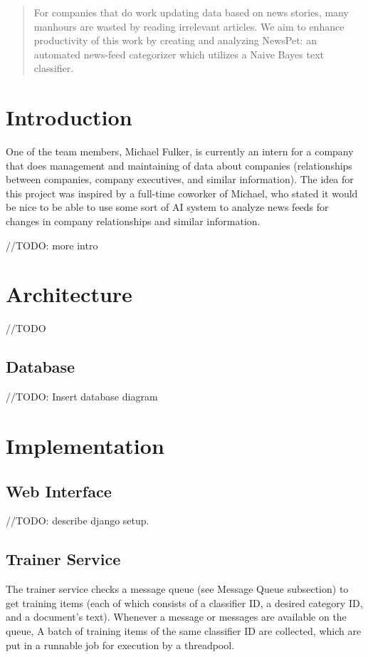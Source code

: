 \documentclass[letterpaper]{article}
\author{Michael Fulker, Anthony Hauber \and Tyson Williams \\
COM S 472 : Principles of Artificial Intelligence\\Department of Computer Science\\ Iowa State University, Ames, IA 50011\\
\texttt{\{calculo, thauber, tyson\}@cs.iastate.edu}}
\begin{document}
\nocopyright%
\maketitle

\begin{abstract}
For companies that do work updating data based on news stories, many manhours are wasted by reading irrelevant articles. We aim to enhance productivity of this work by creating and analyzing NewsPet: an automated news-feed categorizer which utilizes a Naive Bayes text classifier.
\end{abstract}


\section{Introduction}
One of the team members, Michael Fulker, is currently an intern for a company that does management and maintaining of data about companies (relationships between companies, company executives, and similar information). The idea for this project was inspired by a full-time coworker of Michael, who stated it would be nice to be able to use some sort of AI system to analyze news feeds for changes in company relationships and similar information.

//TODO: more intro

\section{Architecture}
//TODO
\subsection{Database}
//TODO: Insert database diagram

\section{Implementation}
\subsection{Web Interface}
//TODO: describe django setup.

\subsection{Trainer Service}
The trainer service checks a message queue (see Message Queue subsection) to get training items (each of which consists of a classifier ID, a desired category ID, and a document's text).
Whenever a message or messages are available on the queue, A batch of training items of the same classifier ID are collected, which are put in a runnable job for execution by a threadpool.
\end{document}
